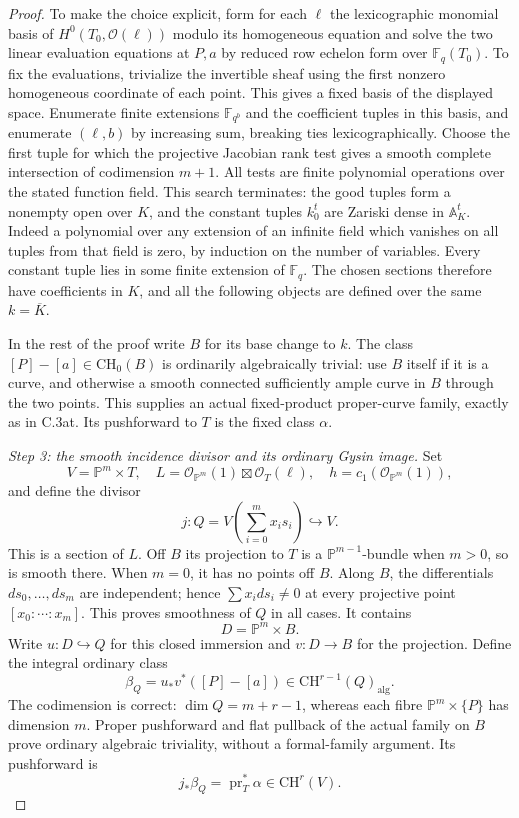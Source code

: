 \begin{proof}
To make the choice explicit, form for each $\ell$ the lexicographic
monomial basis of $H^0(T_0,\mathcal O(\ell))$ modulo its homogeneous
equation and solve the two linear evaluation equations at $P,a$ by
reduced row echelon form over $\mathbb F_q(T_0)$. To fix the
evaluations, trivialize the invertible sheaf using the first nonzero
homogeneous coordinate of each point. This gives a fixed
basis of the displayed space. Enumerate finite extensions
$\mathbb F_{q^b}$ and the coefficient tuples in this basis, and
enumerate $(\ell,b)$ by increasing sum, breaking ties lexicographically.
Choose the first tuple for which the projective Jacobian rank test
gives a smooth complete intersection of codimension $m+1$.
All tests are finite polynomial operations over the stated function
field. This search terminates: the good tuples form a nonempty open
over $K$, and the constant tuples $k_0^t$ are Zariski dense in
$\mathbb A^t_K$. Indeed a polynomial over any extension of an infinite
field which vanishes on all tuples from that field is zero, by
induction on the number of variables. Every constant tuple lies in
some finite extension of $\mathbb F_q$. The chosen sections therefore
have coefficients in $K$, and all the following objects are defined
over the same $k=\overline K$.

In the rest of the proof write $B$ for its base change to $k$.
The class $[P]-[a]\in\mathrm{CH}_0(B)$ is ordinarily algebraically
trivial: use $B$ itself if it is a curve, and otherwise a smooth
connected sufficiently ample curve in $B$ through the two points.
This supplies an actual fixed-product proper-curve family, exactly as
in C.3at. Its pushforward to $T$ is the fixed class $\alpha$.

\emph{Step 3: the smooth incidence divisor and its ordinary Gysin image.}
Set
\[
 V=\mathbb P^m\times T,
 \quad L=\mathcal O_{\mathbb P^m}(1)\boxtimes\mathcal O_T(\ell),
 \quad h=c_1(\mathcal O_{\mathbb P^m}(1)),
\]
and define the divisor
\[
 j:Q=V\!\left(\sum_{i=0}^m x_i s_i\right)\hookrightarrow V.
\]
This is a section of $L$. Off $B$ its projection to $T$ is a
$\mathbb P^{m-1}$-bundle when $m>0$, so is smooth there. When
$m=0$, it has no points off $B$. Along $B$, the differentials
$ds_0,\ldots,ds_m$ are independent; hence
$\sum x_i ds_i\ne0$ at every projective point $[x_0:\cdots:x_m]$.
This proves smoothness of $Q$ in all cases. It contains
\[
                         D=\mathbb P^m\times B.
\]
Write $u:D\hookrightarrow Q$ for this closed immersion and
$v:D\to B$ for the projection. Define the integral ordinary class
\[
              \beta_Q=u_*v^*([P]-[a])
                       \in\mathrm{CH}^{r-1}(Q)_{\mathrm{alg}}.
\]
The codimension is correct: $\dim Q=m+r-1$, whereas each fibre
$\mathbb P^m\times\{P\}$ has dimension $m$. Proper pushforward
and flat pullback of the actual family on $B$ prove ordinary algebraic
triviality, without a formal-family argument. Its pushforward is
\[
                j_*\beta_Q=\operatorname{pr}_T^*\alpha
                                      \in\mathrm{CH}^r(V).
\]


\end{proof}
